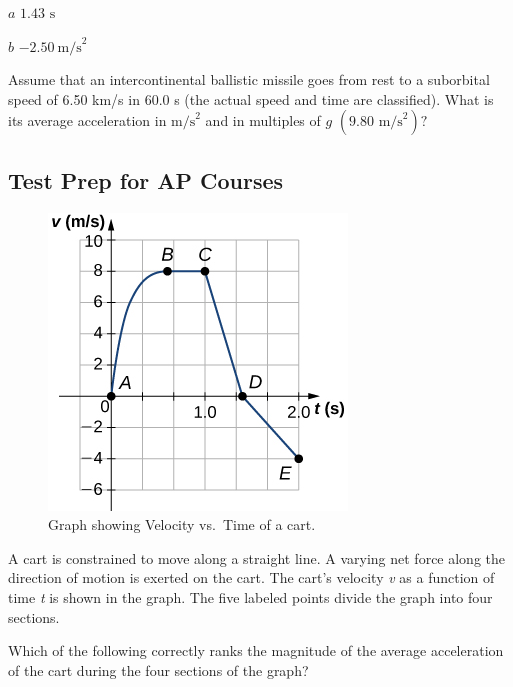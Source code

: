 \documentclass[
]{book}
\begin{document}
\leavevmode{}%
\(a\) \({1\text{.}\text{43\ s}}{}\)

\(b\) \({{- 2}\text{.}\text{50}\ \text{m/s}^{2}}{}\)

\hypertarget{fs-id4124470}{}
\leavevmode{}%
Assume that an intercontinental ballistic missile goes from rest to a
suborbital speed of 6.50 km/s in 60.0 s (the actual speed and time are
classified). What is its average acceleration in \(\text{m/s}^{2}{}\) and
in multiples of \(g{}\) \({{(9\text{.}\text{80\ m}\text{/s}^{2})}?}{}\)

\hypertarget{fs-id1922895}{}
\hypertarget{test-prep-for-ap-courses-3}{%
\subsection{Test Prep for AP Courses}\label{test-prep-for-ap-courses-3}}

\hypertarget{fs-id1454119}{}
\leavevmode{}%
\begin{figure}
\hypertarget{fs-id3184333}{%
\centering
\includegraphics{images/Figure_Ch2_M4_14.jpg}
\caption{Graph showing Velocity vs.~Time of a
cart.}\label{fs-id3184333}
}
\end{figure}

A cart is constrained to move along a straight line. A varying net force
along the direction of motion is exerted on the cart. The cart's
velocity \emph{v} as a function of time \emph{t} is shown in the graph. The five
labeled points divide the graph into four sections.

Which of the following correctly ranks the magnitude of the average
acceleration of the cart during the four sections of the graph?
\end{document}
